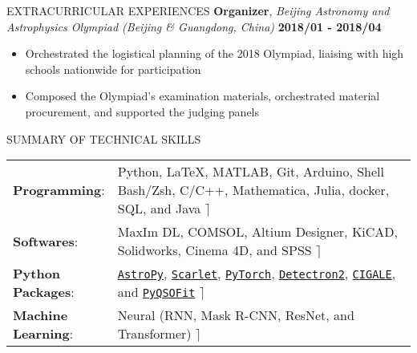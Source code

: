 \documentclass[10pt]{article} %
\begin{document}
\begin{section}{EXTRACURRICULAR EXPERIENCES}
\textbf{Organizer}, \textit{Beijing Astronomy and Astrophysics Olympiad (Beijing \& Guangdong, China)} \hfill \textbf{2018/01 - 2018/04} 
\begin{itemize}[leftmargin=1.5em]
    \item Orchestrated the logistical planning of the 2018 Olympiad, liaising with high schools nationwide for participation
    \item Composed the Olympiad's examination materials, orchestrated material procurement, and supported the judging panels
\end{itemize}

\end{section}

\begin{section}{SUMMARY OF TECHNICAL SKILLS}

    \begin{tabular}{@{}p{0.2\linewidth}@{}p{0.8\linewidth}@{}}
        \textbf{Programming}: & Python, \LaTeX, MATLAB, Git, Arduino, Shell Bash/Zsh, C/C++, Mathematica, Julia, docker, SQL, and Java  \hfill $\rceil$\\
        \textbf{Softwares}: & MaxIm DL, COMSOL, Altium Designer, KiCAD, Solidworks, Cinema 4D, and SPSS  \hfill $\rceil$\\
        \textbf{Python Packages}: & \href{https://www.astropy.org/}{\texttt{AstroPy}}, \href{https://github.com/pmelchior/scarlet}{\texttt{Scarlet}}, \href{https://pytorch.org/}{\texttt{PyTorch}}, \href{https://github.com/facebookresearch/detectron2}{\texttt{Detectron2}}, \href{https://cigale.lam.fr/}{\texttt{CIGALE}}, and \href{https://github.com/legolason/PyQSOFit}{\texttt{PyQSOFit}}  \hfill $\rceil$\\
        \textbf{Machine Learning}: & Neural (RNN, Mask R-CNN, ResNet, and Transformer)  \hfill $\rceil$\\
    \end{tabular}
    
    \end{section} 
\end{document}
